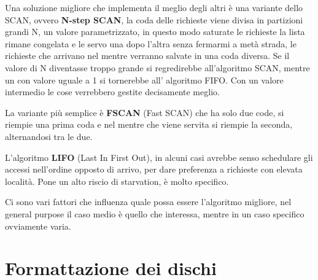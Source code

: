\documentclass[a4paper, 12pt]{book}
\begin{document}
Una soluzione migliore che implementa il meglio degli altri
è una variante dello SCAN, ovvero \textbf{N-step SCAN}, 
la coda delle richieste viene divisa in partizioni grandi 
N, un valore parametrizzato, in questo modo saturate le richieste 
la lista rimane congelata e le servo una dopo l'altra senza 
fermarmi a metà strada, le richieste che arrivano nel mentre 
verranno salvate in una coda diversa. Se il valore di N 
diventasse troppo grande si regredirebbe all'algoritmo 
SCAN, mentre un con valore uguale a 1 si tornerebbe all'
algoritmo FIFO. Con un valore intermedio le cose verrebbero 
gestite decisamente meglio.

La variante più semplice è \textbf{FSCAN} (Fast SCAN)
che ha solo due code, si riempie una prima coda e nel 
mentre che viene servita si riempie la seconda, alternandosi 
tra le due.

L'algoritmo \textbf{LIFO} (Last In First Out), in alcuni 
casi avrebbe senso schedulare gli accessi nell'ordine opposto
di arrivo, per dare preferenza a richieste con elevata località.
Pone un alto riscio di starvation, è molto specifico.

Ci sono vari fattori che influenza quale possa essere 
l'algoritmo migliore, nel general purpose il caso medio 
è quello che interessa, mentre in un caso specifico ovviamente 
varia.

\section{Formattazione dei dischi}
\end{document}
